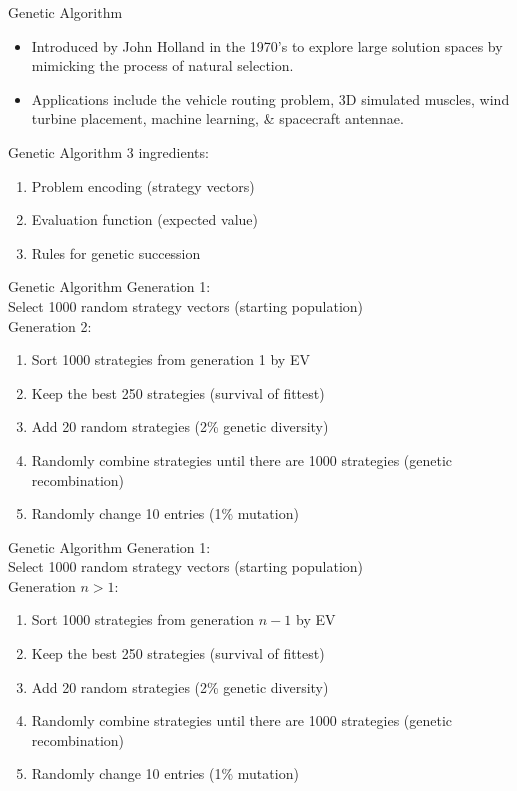 \documentclass{beamer}
\begin{document}
  \begin{frame}{Genetic Algorithm}
  \begin{itemize}
  \item Introduced by John Holland in the 1970's to explore large solution spaces by mimicking the process of natural selection.
  \item Applications include the vehicle routing problem, 3D simulated muscles, wind turbine placement, machine learning, \& spacecraft antennae.
  \end{itemize}
  \end{frame}

  \begin{frame}{Genetic Algorithm}
	3 ingredients:
	\begin{enumerate}
		\item Problem encoding (strategy vectors)
		\item Evaluation function (expected value)
		\item Rules for genetic succession
	\end{enumerate}
  \end{frame}

  \begin{frame}{Genetic Algorithm}
  Generation 1: \\
  	\hspace{18 pt} Select 1000 random strategy vectors (starting population) \\
  \medskip
   Generation 2:
    \begin{enumerate}
    \item Sort 1000 strategies from generation 1 by EV
    \item Keep the best 250 strategies (survival of fittest)
    \item Add 20 random strategies (2\% genetic diversity) 
    \item Randomly combine strategies until there are 1000 strategies (genetic recombination)
    \item Randomly change 10 entries (1\% mutation)
  \end{enumerate}
  \end{frame}

  \begin{frame}{Genetic Algorithm}
  Generation 1: \\
  	\hspace{18 pt} Select 1000 random strategy vectors (starting population) \\
  \medskip
   Generation $n>1$:
    \begin{enumerate}
    \item Sort 1000 strategies from generation $n-1$ by EV
    \item Keep the best 250 strategies (survival of fittest)
    \item Add 20 random strategies (2\% genetic diversity) 
    \item Randomly combine strategies until there are 1000 strategies (genetic recombination)
    \item Randomly change 10 entries (1\% mutation)
  \end{enumerate}
  \end{frame}
  
\end{document}
